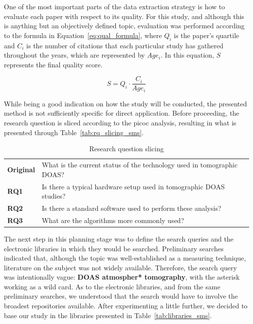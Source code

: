 One of the most important parts of the data extraction strategy is how
to evaluate each paper with respect to its quality. For this study, and
although this is anything but an objectively defined topic, evaluation
was performed according to the formula in
Equation~\ref{eq:qual_formula}, where $Q_i$ is the paper's quartile and
$C_i$ is the number of citations that each particular study has gathered
throughout the years, which are represented by $Age_i$. In this
equation, $S$ represents the final quality score.

\begin{equation}
    \label{eq:qual_formula}
    S = Q_{i} \cdot \frac{C_i}{Age_i}
\end{equation}

While being a good indication on how the study will be conducted, the
presented method is not sufficiently specific for direct application.
Before proceeding, the research question is sliced according to the
\gls{picoc} analysis, resulting in what is presented through
Table~\ref{tab:rq_slicing_sms}.

\begin{table}[htb]
\centering
\small
\caption{Research question slicing}
\label{tab:rq_slicing}
    \begin{tabularx}{\textwidth}{lX}
        \toprule
        \textbf{Original} & What is the current status of the technology used in
        tomographic DOAS? \\
        \textbf{RQ1} & Is there a typical hardware setup used in tomographic
        DOAS studies? \\
        \textbf{RQ2} & Is there a standard software used to perform these
        analysis? \\
        \textbf{RQ3} & What are the algorithms more commonly used?\\\bottomrule
    \end{tabularx}
\end{table}

The next step in this planning stage was to define the search queries
and the electronic libraries in which they would be searched.
Preliminary searches indicated that, although the topic was
well-established as a measuring technique, literature on the subject was
not widely available. Therefore, the search query was intentionally
vague: \textbf{DOAS atmospher* tomography}, with the asterisk working as
a wild card. As to the electronic libraries, and from the same
preliminary searches, we understood that the search would have to
involve the broadest repositories available. After experimenting a
little further, we decided to base our study in the libraries presented
in Table~\ref{tab:libraries_sms}.

